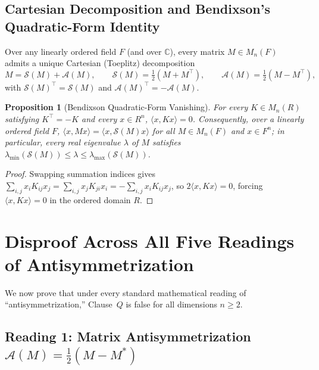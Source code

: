 \documentclass[11pt,a4paper]{article}
\theoremstyle{plain}
\newtheorem{proposition}[theorem]{Proposition}
\theoremstyle{definition}
\newcommand{\C}{\mathbb{C}}
\newcommand{\Sp}{\mathcal{S}}
\newcommand{\Ap}{\mathcal{A}}
\begin{document}
\subsection{Cartesian Decomposition and Bendixson's Quadratic-Form Identity}
Over any linearly ordered field $F$ (and over $\C$), every matrix $M \in M_n(F)$ admits a unique Cartesian (Toeplitz) decomposition
\[
  M = \Sp(M) + \Ap(M), \qquad
  \Sp(M) = \tfrac{1}{2}(M + M^\top), \qquad
  \Ap(M) = \tfrac{1}{2}(M - M^\top),
\]
with $\Sp(M)^\top = \Sp(M)$ and $\Ap(M)^\top = -\Ap(M)$.

\begin{proposition}[Bendixson Quadratic-Form Vanishing]\label{prop:bendixson}
For every $K \in M_n(R)$ satisfying $K^\top = -K$ and every $x \in R^n$, $\langle x, K x \rangle = 0$. Consequently, over a linearly ordered field $F$, $\langle x, M x \rangle = \langle x, \Sp(M) x \rangle$ for all $M \in M_n(F)$ and $x \in F^n$; in particular, every real eigenvalue $\lambda$ of $M$ satisfies $\lambda_{\min}(\Sp(M)) \le \lambda \le \lambda_{\max}(\Sp(M))$.
\end{proposition}

\begin{proof}
Swapping summation indices gives $\sum_{i,j} x_i K_{ij} x_j = \sum_{i,j} x_j K_{ji} x_i = -\sum_{i,j} x_i K_{ij} x_j$, so $2 \langle x, K x \rangle = 0$, forcing $\langle x, K x \rangle = 0$ in the ordered domain $R$.
\end{proof}

\section{Disproof Across All Five Readings of Antisymmetrization}

We now prove that under every standard mathematical reading of ``antisymmetrization,'' Clause~$Q$ is false for all dimensions $n \ge 2$.

\subsection{Reading 1: Matrix Antisymmetrization $\Ap(M) = \frac{1}{2}(M - M^*)$}
\end{document}
